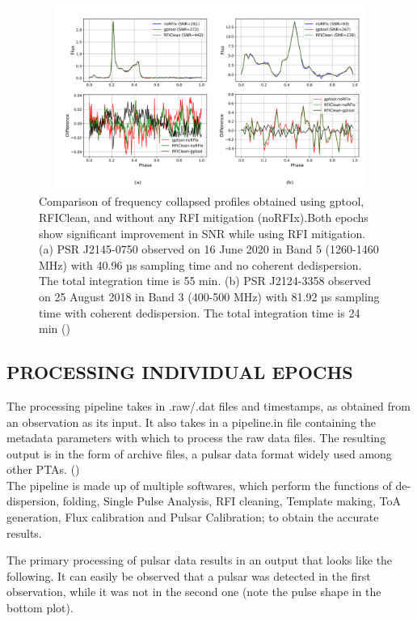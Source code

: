 \documentclass{article}
\begin{document}
\begin{figure}[htbp]
\begin{center}
\includegraphics[height=6cm,width=14cm]{Images/V2_6.png} 
\caption{Comparison of frequency collapsed profiles obtained using gptool, RFIClean, and without any RFI mitigation (noRFIx).Both epochs show significant improvement in SNR while using RFI mitigation. (a) PSR J2145-0750 observed on 16 June 2020 in Band 5 (1260-1460 MHz) with 40.96 µs sampling time and no coherent dedispersion. The total integration time is 55 min. (b) PSR J2124-3358 observed on 25 August 2018 in Band 3 (400-500 MHz) with 81.92 µs sampling time with coherent dedispersion. The total integration time is 24 min (\cite{Susobhanan+2021})}
\end{center}
\end{figure}

\clearpage
\newpage
\subsection{PROCESSING INDIVIDUAL EPOCHS}
The processing pipeline takes in  .raw/.dat files and timestamps, as obtained from an observation as its input. It also takes in a pipeline.in file containing the metadata parameters with which to process the raw data files. The resulting output is in the form of archive files, a pulsar data format widely used among other PTAs. (\cite{Susobhanan+2021})
\\
The pipeline is made up of multiple softwares, which perform the functions of de-dispersion, folding, Single Pulse Analysis,  RFI cleaning, Template making, ToA generation, Flux calibration and Pulsar Calibration; to obtain the accurate results.

The primary processing of pulsar data results in an output that looks like the following. It can easily be observed that a pulsar was detected in the first observation, while it was not in the second one (note the pulse shape in the bottom plot).\\
\end{document}
